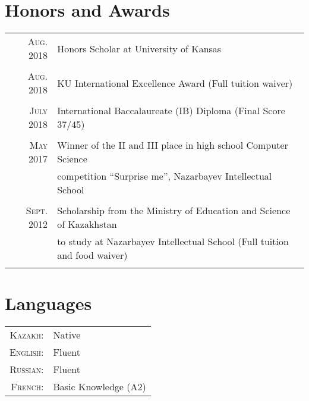 \documentclass[a4paper,10pt]{article}
\begin{document}
\section{Honors and Awards}
\begin{tabular}{rl}
  
  \textsc{Aug.} 2018 & Honors Scholar at University of Kansas\\\\

  \textsc{Aug.} 2018 & KU International Excellence Award \footnotesize{(Full tuition waiver)}\\\\

  \textsc{July} 2018 & International Baccalaureate (IB) Diploma \footnotesize(Final Score 37/45)\\\\

  \textsc{May} 2017 & Winner of the II and III place in high school Computer Science \\&competition “Surprise me”, Nazarbayev Intellectual School\\\\

  \textsc{Sept.} 2012 & Scholarship from the Ministry of Education and Science of Kazakhstan\\&to study at Nazarbayev Intellectual School \footnotesize(Full tuition and food waiver)\normalsize\\\\

\end{tabular}

\section{Languages}
\begin{tabular}{rl}
 \textsc{Kazakh:}&Native\\
 \textsc{English:}&Fluent\\
 \textsc{Russian:}&Fluent\\
 \textsc{French:}&Basic Knowledge (A2)\\
\end{tabular}
\end{document}
